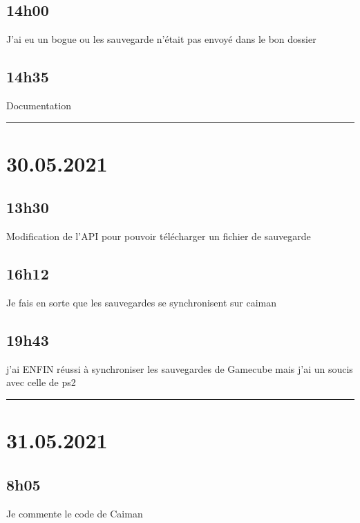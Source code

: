 \documentclass[a4paper,12pt,french]{sphinxmanual}
\begin{document}
\subsection{14h00}
\label{\detokenize{logbook:id171}}
\sphinxAtStartPar
J’ai eu un bogue ou les sauvegarde n’était pas envoyé dans le bon dossier


\subsection{14h35}
\label{\detokenize{logbook:id172}}
\sphinxAtStartPar
Documentation


\bigskip\hrule\bigskip



\section{30.05.2021}
\label{\detokenize{logbook:id173}}

\subsection{13h30}
\label{\detokenize{logbook:id174}}
\sphinxAtStartPar
Modification de l’API pour pouvoir télécharger un fichier de sauvegarde


\subsection{16h12}
\label{\detokenize{logbook:h12}}
\sphinxAtStartPar
Je fais en sorte que les sauvegardes se synchronisent sur caiman


\subsection{19h43}
\label{\detokenize{logbook:h43}}
\sphinxAtStartPar
j’ai ENFIN réussi à synchroniser les sauvegardes de Gamecube mais j’ai un soucis avec celle de ps2


\bigskip\hrule\bigskip



\section{31.05.2021}
\label{\detokenize{logbook:id175}}

\subsection{8h05}
\label{\detokenize{logbook:id176}}
\sphinxAtStartPar
Je commente le code de Caiman
\end{document}
